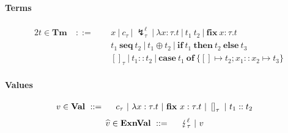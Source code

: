 \documentclass{llncs}
\newcommand{\ClassVal}{\mathbf{Val}}
\newcommand{\ClassExnVal}{\mathbf{ExnVal}}
\newcommand{\ClassTm}{\mathbf{Tm}}
\newcommand{\Val}{v}
\newcommand{\ExnVal}{\widehat{v}}
\newcommand{\Tm}{t}
\newcommand{\TmVar}{x}
\newcommand{\TmCon}[1]{c_{#1}}
\newcommand{\TmAbs}[3]{\lambda #1 : #2. #3}
\newcommand{\TmApp}[2]{#1\ #2}
\newcommand{\TmOp}[2]{#1 \oplus #2}
\newcommand{\TmIf}[3]{\mathbf{if}\ #1\ \mathbf{then}\ #2\ \mathbf{else}\ #3}
\newcommand{\TmCrash}[2]{\lightning_{#1}^{#2}}
\newcommand{\TmSeq}[2]{#1\ \mathbf{seq}\ #2}
\newcommand{\TmFIX}[3]{\mathbf{fix}\ #1 : #2. #3}
\newcommand{\TmNil}[1]{\left[\right]_{#1}}
\newcommand{\TmCons}[2]{#1 :: #2}
\newcommand{\TmCase}[5]{\mathbf{case}\ #1\ \mathbf{of}\ \{\left[\right]\mapsto #2; #3 :: #4 \mapsto #5\}}
\newcommand{\ExnLbl}{\ell}
\newcommand{\Ty}{\tau}
\begin{document}
\paragraph{Terms}
\begin{alignat*}{2}
    \Tm \in \ClassTm &\ ::=\   &&\ \TmVar                   %
                     \ |  \ \TmCon{\Ty}              %
                     \ |  \ \TmCrash{\Ty}{\ExnLbl}   %
                     \ |  \ \TmAbs{\TmVar}{\Ty}{\Tm} %
                     \ |  \ \TmApp{\Tm_1}{\Tm_2}     %
                     \ |  \ \TmFIX{\TmVar}{\Ty}{\Tm} %
                     \\& &&\ \TmSeq{\Tm_1}{\Tm_2}     %
                     \ |  \ \TmOp{\Tm_1}{\Tm_2}      %
                     \ |  \ \TmIf{\Tm_1}{\Tm_2}{\Tm_3}%
                     \\& &&\ \TmNil{\Ty}              %
                     \ |  \ \TmCons{\Tm_1}{\Tm_2}    %
                     \ |  \ \TmCase{\Tm_1}{\Tm_2}{\TmVar_1}{\TmVar_2}{\Tm_3}
\end{alignat*}
\paragraph{Values}
\begin{alignat}{2}
\Val \in \ClassVal &\ ::=\  &&\ \TmCon{\Ty}\ |\ \TmAbs{\TmVar}{\Ty}{\Tm}\ |\ \TmFIX{\TmVar}{\Ty}{\Tm}\ |\ \TmNil{\Ty}\ |\ \TmCons{\Tm_1}{\Tm_2} \notag
\end{alignat}
\begin{alignat}{2}
\ExnVal \in \ClassExnVal &\ ::=\  &&\ \TmCrash{\Ty}{\ExnLbl}\ |\ \Val \notag
\end{alignat}
\end{document}
